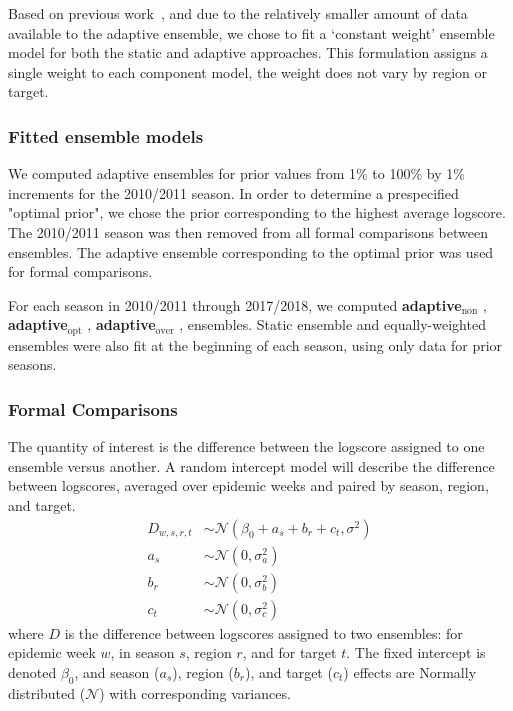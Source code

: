 \documentclass[12pt]{article}
\def\l{\left}
\def\r{\right}
\def\adaptNon{\textbf{adaptive$_{\text{non}}$ }}
\def\adaptOpt{\textbf{adaptive$_{\text{opt}}$ }}
\def\adaptOver{\textbf{adaptive$_{\text{over}}$ }}
\begin{document}
Based on previous work~\cite{reich2019collaborativepnas}, and due to the relatively smaller amount of data available to the adaptive ensemble, we chose to fit a  `constant weight' ensemble model for both the static and adaptive approaches. This formulation assigns a single weight to each component model, the weight does not vary by region or target.


\subsubsection{Fitted ensemble models}

We computed adaptive ensembles for prior values from 1\% to 100\% by 1\% increments for the 2010/2011 season.
In order to determine a prespecified "optimal prior", we chose the prior corresponding to the highest average logscore.
The 2010/2011 season was then removed from all formal comparisons between ensembles.
The adaptive ensemble corresponding to the optimal prior was used for formal comparisons.

For each season in 2010/2011 through 2017/2018, we computed \adaptNon, \adaptOpt, \adaptOver,  ensembles.
Static ensemble and equally-weighted ensembles were also fit at the beginning of each season, using only data for prior seasons.


\subsubsection{Formal Comparisons}

The quantity of interest is the difference between the logscore assigned to one ensemble versus another.
A random intercept model will describe the difference between logscores, averaged over epidemic weeks and paired by season, region, and target.
\begin{align}
    D_{w,s,r,t} &\sim \mathcal{N}\l( \beta_{0} + a_{s} + b_{r} + c_{t}, \sigma^{2} \r)\\
    a_{s} &\sim \mathcal{N}\l(0,\sigma^{2}_{a}\r) \nonumber \\
    b_{r} &\sim \mathcal{N}\l(0,\sigma^{2}_{b}\r) \nonumber \\
    c_{t} &\sim \mathcal{N}\l(0,\sigma^{2}_{c}\r) \nonumber
\end{align}
where $D$ is the difference between logscores assigned to two ensembles: for epidemic week $w$, in season $s$, region $r$, and for target $t$.
The fixed intercept is denoted $\beta_{0}$, and season ($a_{s}$), region ($b_{r}$), and target ($c_{t}$) effects are Normally distributed ($\mathcal{N}$) with corresponding variances.
\end{document}
